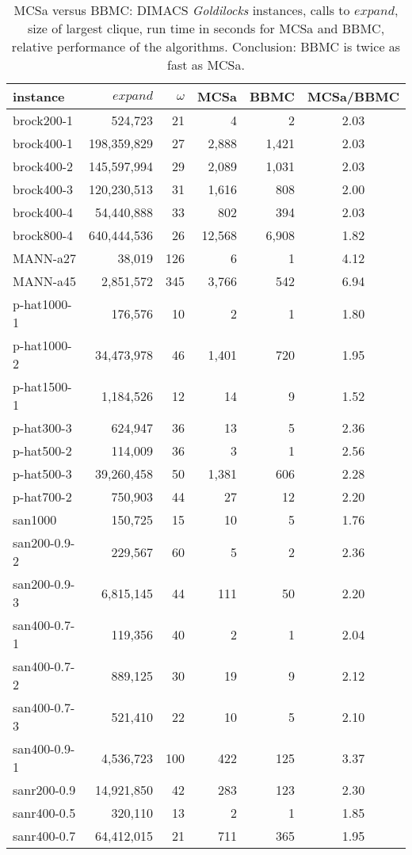 \documentclass[runningheads]{llncs}
\begin{document}
\begin{table}
\begin{center}
\begin{scriptsize}
\begin{tabular}{|l | r r | r r |c|} \hline 
instance & $expand$ & $\omega$ & MCSa & BBMC & MCSa/BBMC \\ \hline
brock200-1 & 524,723 & 21 & 4 & 2 & 2.03   \\ 
brock400-1 & 198,359,829 & 27 & 2,888 & 1,421 & 2.03   \\ 
brock400-2 & 145,597,994 & 29 & 2,089 & 1,031 & 2.03   \\ 
brock400-3 & 120,230,513 & 31 & 1,616 & 808 & 2.00   \\ 
brock400-4 & 54,440,888 & 33 & 802 & 394 & 2.03   \\ 
brock800-4 & 640,444,536 & 26 & 12,568 & 6,908 & 1.82   \\ 
MANN-a27 & 38,019 & 126 & 6 & 1 & 4.12   \\ 
MANN-a45 & 2,851,572 & 345 & 3,766 & 542 & 6.94   \\ 
p-hat1000-1 & 176,576 & 10 & 2 & 1 & 1.80   \\ 
p-hat1000-2 & 34,473,978 & 46 & 1,401 & 720 & 1.95   \\ 
p-hat1500-1 & 1,184,526 & 12 & 14 & 9 & 1.52   \\ 
p-hat300-3 & 624,947 & 36 & 13 & 5 & 2.36   \\ 
p-hat500-2 & 114,009 & 36 & 3 & 1 & 2.56   \\ 
p-hat500-3 & 39,260,458 & 50 & 1,381 & 606 & 2.28   \\ 
p-hat700-2 & 750,903 & 44 & 27 & 12 & 2.20   \\ 
san1000 & 150,725 & 15 & 10 & 5 & 1.76   \\ 
san200-0.9-2 & 229,567 & 60 & 5 & 2 & 2.36   \\ 
san200-0.9-3 & 6,815,145 & 44 & 111 & 50 & 2.20   \\ 
san400-0.7-1 & 119,356 & 40 & 2 & 1 & 2.04   \\ 
san400-0.7-2 & 889,125 & 30 & 19 & 9 & 2.12   \\ 
san400-0.7-3 & 521,410 & 22 & 10 & 5 & 2.10   \\ 
san400-0.9-1 & 4,536,723 & 100 & 422 & 125 & 3.37   \\ 
sanr200-0.9 & 14,921,850 & 42 & 283 & 123 & 2.30   \\ 
sanr400-0.5 & 320,110 & 13 & 2 & 1 & 1.85   \\ 
sanr400-0.7 & 64,412,015 & 21 & 711 & 365 & 1.95   \\ \hline
\end{tabular}
\end{scriptsize}
\end{center}
\caption{MCSa versus BBMC: DIMACS \emph{Goldilocks} instances, calls to $expand$, size of largest clique, run time in seconds for MCSa and BBMC, 
relative performance of the algorithms. Conclusion: BBMC is twice as fast as MCSa.}
\label{tableMCSvBBMC}
\end{table}
\end{document}
